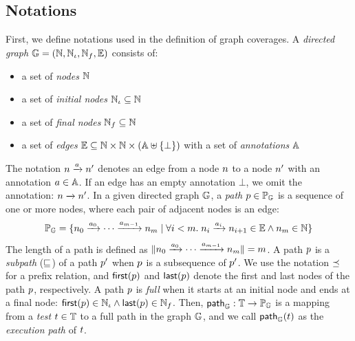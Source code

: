 \subsection{Notations}\label{sec:notation}
%
First, we define notations used in the definition of graph coverages.
%
A \textit{directed graph} $\mathbb{G} = (\mathbb{N}, \mathbb{N}_\iota,
\mathbb{N}_f, \mathbb{E})$ consists of:
\begin{itemize}
  \item a set of \textit{nodes} $\mathbb{N}$
  \item a set of \textit{initial nodes} $\mathbb{N}_\iota \subseteq \mathbb{N}$
  \item a set of \textit{final nodes} $\mathbb{N}_f \subseteq \mathbb{N}$
  \item a set of \textit{edges} $\mathbb{E} \subseteq \mathbb{N} \times \mathbb{N}
    \times (\mathbb{A} \uplus \{ \bot \})$ with a set of \textit{annotations}
    $\mathbb{A}$
\end{itemize}
%
The notation $n \xrightarrow{a} n'$ denotes an edge from a node $n$ to
a node $n'$ with an annotation $a \in \mathbb{A}$.
%
If an edge has an empty annotation $\bot$, we omit the annotation: $n
\xrightarrow{} n'$.
%
In a given directed graph $\mathbb{G}$, a \textit{path} $p \in \mathbb{P}_{\mathbb{G}}$
is a sequence of one or more nodes, where each pair of adjacent nodes is an
edge:
\begin{equation}\label{euq:path-def}
  \mathbb{P}_{\mathbb{G}} = \{
    n_0 \xrightarrow{a_0} \cdots \xrightarrow{a_{m-1}} n_m \mid
    \forall i < m. \; n_i \xrightarrow{a_i} n_{i+1} \in \mathbb{E} \wedge
    n_m \in \mathbb{N}
  \}
\end{equation}
%
The length of a path is defined as $\lVert{n_0 \xrightarrow{a_0} \cdots
\xrightarrow{a_{m-1}} n_m}\rVert = m$.
%
A path $p$ is a \textit{subpath} ($\sqsubseteq$) of a path $p'$ when $p$
is a subsequence of $p'$.
%
We use the notation $\preceq$ for a prefix relation, and $\textsf{first}(p)$ and
$\textsf{last}(p)$ denote the first and last nodes of the path $p$,
respectively.
%
A path $p$ is \textit{full} when it starts at an initial node and ends at a
final node: $\textsf{first}(p) \in \mathbb{N}_\iota \wedge \textsf{last}(p) \in \mathbb{N}_f$.
%
Then, $\textsf{path}_{\mathbb{G}} : \mathbb{T} \rightarrow \mathbb{P}_{\mathbb{G}}$ is a mapping from
a \textit{test} $t \in \mathbb{T}$ to a full path in the graph $\mathbb{G}$, and
we call $\textsf{path}_{\mathbb{G}}(t)$ as the \textit{execution path} of $t$.



